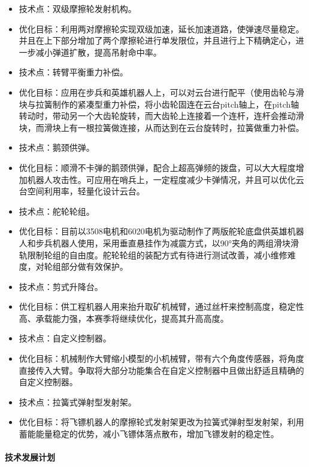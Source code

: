 \begin{itemize}
            \item 技术点：双级摩擦轮发射机构。
            \item 优化目标：利用两对摩擦轮实现双级加速，延长加速道路，使弹速尽量稳定。并且在上下部分增加了两个摩擦轮进行单发限位，并且进行上下精确定心，进一步减小弹道扩散，提高吊射命中率。
            \item 技术点：转臂平衡重力补偿。
            \item 优化目标：应用在步兵和英雄机器人上，可以对云台进行配平（使用齿轮与滑块与拉簧制作的紧凑型重力补偿，将小齿轮固连在云台pitch轴上，在pitch轴转动时，带动另一个大齿轮旋转，而大齿轮上连接着一个连杆，连杆会推动滑块，而滑块上有一根拉簧做连接，从而达到在云台旋转时，拉簧做重力补偿。
            \item 技术点：鹅颈供弹。
            \item 优化目标：顺滑不卡弹的鹅颈供弹，配合上超高弹频的拨盘，可以大大程度增加机器人攻击性。可应用在哨兵上，一定程度减少卡弹情况，并且可以优化云台空间利用率，轻量化设计云台。
            \item 技术点：舵轮轮组。
            \item 优化目标：目前以3508电机和6020电机为驱动制作了两版舵轮底盘供英雄机器人和步兵机器人使用，采用垂直悬挂作为减震方式，以90°夹角的两组滑块滑轨限制轮组的自由度。舵轮轮组的装配方式有待进行测试改善，减小维修难度，对轮组部分做有效保护。
            \item 技术点：剪式升降台。
            \item 优化目标：供工程机器人用来抬升取矿机械臂，通过丝杆来控制高度，稳定性高、承载能力强，本赛季将继续优化，提高其升高高度。
            \item 技术点：自定义控制器。
            \item 优化目标：机械制作大臂缩小模型的小机械臂，带有六个角度传感器，将角度直接传入大臂。争取将大部分功能集合在自定义控制器中且做出舒适且精确的自定义控制器。
            \item 技术点：拉簧式弹射型发射架。
            \item 优化目标：将飞镖机器人的摩擦轮式发射架更改为拉簧式弹射型发射架，利用蓄能能量稳定的优势，减小飞镖体落点散布，增加飞镖发射的稳定性。
        \end{itemize}

    \paragraph{技术发展计划}
        
